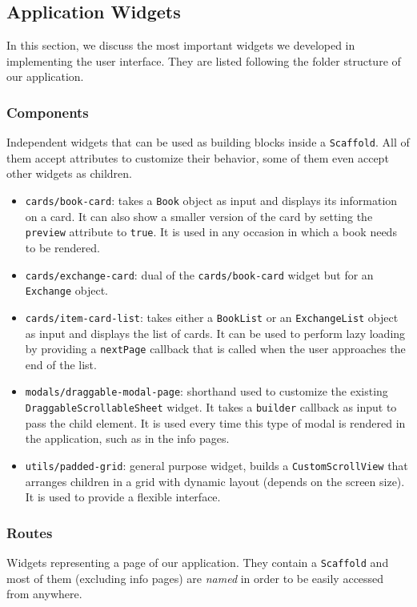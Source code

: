 \subsection{Application Widgets}
In this section, we discuss the most important widgets we developed in implementing the user interface.
They are listed following the folder structure of our application.

\subsubsection{Components}
Independent widgets that can be used as building blocks inside a \texttt{Scaffold}.
All of them accept attributes to customize their behavior, some of them even accept other widgets as children. 

\begin{itemize}
    \item \texttt{cards/book-card}: 
        takes a \texttt{Book} object as input and displays its information on a card.
        It can also show a smaller version of the card by setting the \texttt{preview} attribute to \texttt{true}.
        It is used in any occasion in which a book needs to be rendered.
    \item \texttt{cards/exchange-card}:
        dual of the \texttt{cards/book-card} widget but for an \texttt{Exchange} object.
    \item \texttt{cards/item-card-list}:
        takes either a \texttt{BookList} or an \texttt{ExchangeList} object as input and displays the list of cards.
        It can be used to perform lazy loading by providing a \texttt{nextPage} callback that is called when the user
        approaches the end of the list.
    \item \texttt{modals/draggable-modal-page}:
        shorthand used to customize the existing \texttt{DraggableScrollableSheet} widget.
        It takes a \texttt{builder} callback as input to pass the child element.
        It is used every time this type of modal is rendered in the application, such as in the info pages.
    \item \texttt{utils/padded-grid}:
        general purpose widget, builds a \texttt{CustomScrollView} that arranges children in a grid with
        dynamic layout (depends on the screen size). It is used to provide a flexible interface.
\end{itemize}

\subsubsection{Routes}
Widgets representing a page of our application.
They contain a \texttt{Scaffold} and most of them (excluding info pages) are \emph{named} in order to be easily accessed from anywhere.

